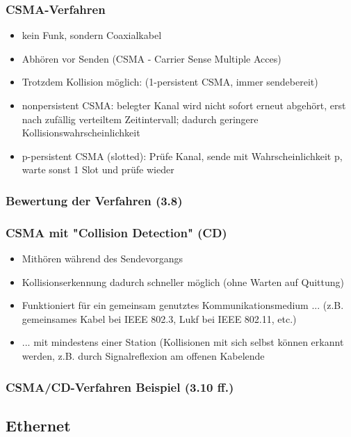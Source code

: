 \subsubsection{CSMA-Verfahren}
\begin{itemize}
	\item kein Funk, sondern Coaxialkabel
	\item Abhören vor Senden (CSMA - Carrier Sense Multiple Acces)
	\item Trotzdem Kollision möglich: (1-persistent CSMA, immer sendebereit)
	\item nonpersistent CSMA: belegter Kanal wird nicht sofort erneut abgehört, erst nach zufällig verteiltem Zeitintervall; dadurch geringere Kollisionswahrscheinlichkeit
	\item p-persistent CSMA (slotted): Prüfe Kanal, sende mit Wahrscheinlichkeit p, warte sonst 1 Slot und prüfe wieder
\end{itemize}
\subsubsection{Bewertung der Verfahren (3.8)}
\subsubsection{CSMA mit "Collision Detection" (CD)}
\begin{itemize}
	\item Mithören während des Sendevorgangs
	\item Kollisionserkennung dadurch schneller möglich (ohne Warten auf Quittung)
	\item Funktioniert für ein gemeinsam genutztes Kommunikationsmedium ... (z.B. gemeinsames Kabel bei IEEE 802.3, Lukf bei IEEE 802.11, etc.)
	\item ... mit mindestens einer Station (Kollisionen mit sich selbst können erkannt werden, z.B. durch Signalreflexion am offenen Kabelende
\end{itemize}
\subsubsection{CSMA/CD-Verfahren Beispiel (3.10 ff.)}
\subsection{Ethernet}
